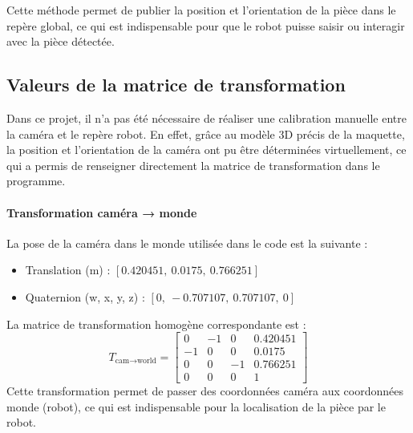 Cette méthode permet de publier la position et l'orientation de la pièce dans le repère global, ce qui est indispensable pour que le robot puisse saisir ou interagir avec la pièce détectée.

\subsection{Valeurs de la matrice de transformation}

Dans ce projet, il n'a pas été nécessaire de réaliser une calibration manuelle entre la caméra et le repère robot. En effet, grâce au modèle 3D précis de la maquette, la position et l'orientation de la caméra ont pu être déterminées virtuellement, ce qui a permis de renseigner directement la matrice de transformation dans le programme.

\begin{minipage}{0.55\textwidth}
    \paragraph{Transformation caméra → monde}
    La pose de la caméra dans le monde utilisée dans le code est la suivante :
    \begin{itemize}
        \item Translation (m) : $[0.420451,\ 0.0175,\ 0.766251]$
        \item Quaternion (w, x, y, z) : $[0,\ -0.707107,\ 0.707107,\ 0]$
    \end{itemize}
    {}%
    La matrice de transformation homogène correspondante est :
    \begin{equation*}
        T_{\text{cam} \to \text{world}} =
        \begin{bmatrix}
            0 & -1 & 0 & 0.420451 \\
           -1 & 0 & 0  & 0.0175   \\
            0 & 0 & -1  & 0.766251 \\
            0 & 0 & 0  & 1
        \end{bmatrix}
    \end{equation*}
    Cette transformation permet de passer des coordonnées caméra aux coordonnées monde (robot), ce qui est indispensable pour la localisation de la pièce par le robot.
\end{minipage}%
\hfill
